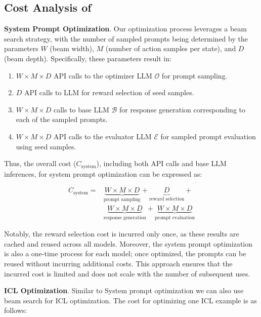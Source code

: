\subsection{Cost Analysis of \ours}
\label{sec:i_cost}
\noindent \textbf{System Prompt Optimization}. 
Our optimization process leverages a beam search strategy, with the number of sampled prompts being determined by the parameters $W$ (beam width), $M$ (number of action samples per state), and $D$ (beam depth). Specifically, these parameters result in:

    \begin{enumerate}
        \item  $W \times M \times D$ API calls to the optimizer LLM $\mathcal{O}$ for prompt sampling.
        \item $D$ API calls to LLM for reward selection of seed samples.
        \item $W \times M \times D$ calls to base LLM $\mathcal{B}$ for response generation corresponding to each of the sampled prompts.
        \item $W \times M \times D$ API calls to the evaluator LLM $\mathcal{E}$ for sampled prompt evaluation using seed samples.
    \end{enumerate}

Thus, the overall cost ($C_{\text{system}}$), including both API calls and base LLM inferences, for system prompt optimization can be expressed as:

\begin{align*}
    C_{\text{system}} = & \underbrace{W \times M \times D}_{\text{prompt sampling}}
    + \underbrace{D}_{\text{reward selection}} + \\
    & \underbrace{W \times M \times D}_{\text{response generation}}
    + \underbrace{W \times M \times D}_{\text{prompt evaluation}}
\end{align*}
    
Notably, the reward selection cost is incurred only once, as these results are cached and reused across all models. Moreover, the system prompt optimization is also a one-time process for each model; once optimized, the prompts can be reused without incurring additional costs. This approach ensures that the incurred cost is limited and does not scale with the number of subsequent uses.

\noindent \textbf{ICL Optimization}.
Similar to System prompt optimization we can also use beam search for ICL optimization. The cost for optimizing one ICL example is as follows:

